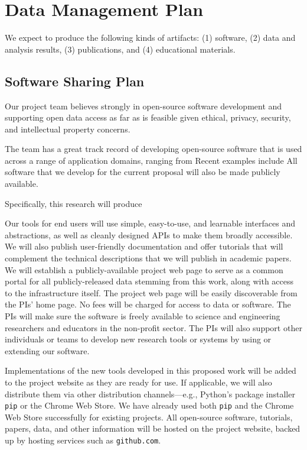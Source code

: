 \section*{Data Management Plan}

We expect to produce the following kinds of artifacts: 
(1) software,
(2) data and analysis results, 
(3) publications, and 
(4) educational materials.

\subsection*{Software Sharing Plan}
Our project team believes strongly in open-source software development and supporting open data access as far as is feasible given ethical, privacy, security, and intellectual property concerns.

The team has a great track record of developing open-source software that is used across a range of application domains, ranging from \xx
Recent examples include \xx
All software that we develop for the current proposal will also be made publicly available.

Specifically, this research will produce \xx

Our tools for end users will use simple, easy-to-use, and learnable interfaces and abstractions, as well as cleanly designed APIs to make them broadly
accessible.
We will also publish user-friendly documentation and offer tutorials that will complement the technical descriptions that we will publish in academic papers. 
We will establish a publicly-available project web page to serve as a common portal for all publicly-released data stemming from this work, along with access to the infrastructure itself.  The project web page will be easily discoverable from the PIs' home page.  No fees will be charged for access to data or software. 
The PIs will make sure the software is freely available to science and engineering researchers and educators in the non-profit sector. 
The PIs will also support other individuals or teams to develop new research tools or systems by using or extending our software.

Implementations of the new tools developed in this proposed work will be added to the project website as they are ready for use.  
If applicable, we will also distribute them via other distribution channels---e.g., Python's package installer \texttt{pip} or the Chrome Web Store.
We have already used both \texttt{pip} and the Chrome Web Store successfully for existing projects.
All open-source software, tutorials, papers, data, and other information will be hosted on the project website, backed up by hosting services such as \texttt{github.com}.

